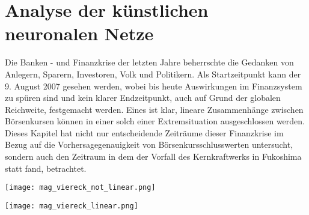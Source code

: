 \chapter{Analyse der künstlichen neuronalen Netze}

Die Banken - und Finanzkrise der letzten Jahre beherrschte die Gedanken von Anlegern, Sparern, Investoren, Volk und Politikern. Als Startzeitpunkt kann der 9. August 2007 gesehen werden, wobei bis heute Auswirkungen im Finanzsystem zu spüren sind und kein klarer Endzeitpunkt, auch auf Grund der globalen Reichweite, festgemacht werden. Eines ist klar, lineare Zusammenhänge zwischen Börsenkursen können in einer solch einer Extremsituation ausgeschlossen werden. Dieses Kapitel hat nicht nur entscheidende Zeiträume dieser Finanzkrise im Bezug auf die Vorhersagegenauigkeit von Börsenkursschlusswerten untersucht, sondern auch den Zeitraum in dem der Vorfall des Kernkraftwerks in Fukoshima statt fand, betrachtet.

\begin{minipage}[c]{0.5\textwidth}

\texttt{[image: mag\_viereck\_not\_linear.png]}

\end{minipage}
\begin{minipage}[c]{0.5\textwidth}
\texttt{[image: mag\_viereck\_linear.png]}
\end{minipage}  